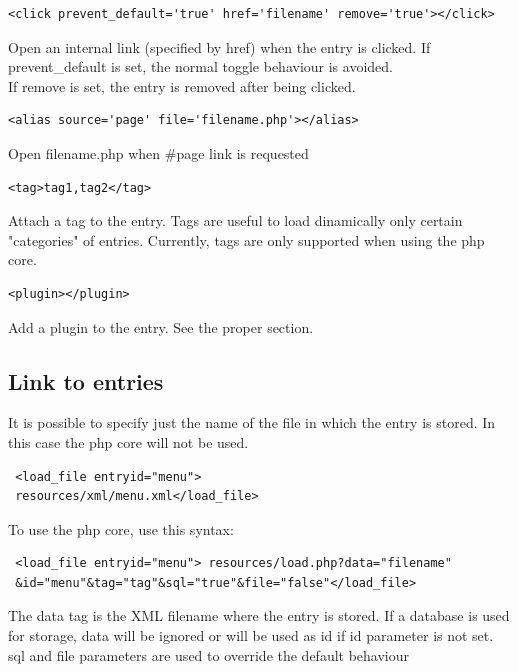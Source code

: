\documentclass[a4paper,12pt]{article}
\begin{document}
\begin{list}{-}{}
\item \begin{verbatim}
<click prevent_default='true' href='filename' remove='true'></click>
\end{verbatim}
Open an internal link (specified by href) when the entry is clicked. If prevent\_default is set, the normal toggle behaviour is avoided.\\
If remove is set, the entry is removed after being clicked.
\item \begin{verbatim}
<alias source='page' file='filename.php'></alias>
\end{verbatim}
Open filename.php when \#page link is requested
\item \begin{verbatim}
<tag>tag1,tag2</tag>
\end{verbatim}
Attach a tag to the entry. Tags are useful to load dinamically only certain "categories" of entries. Currently, tags are only supported when using the php core.
\item \begin{verbatim}
<plugin></plugin>
\end{verbatim}
Add a plugin to the entry. See the proper section.
\end{list}
\normalsize
\subsection{Link to entries}
It is possible to specify just the name of the file in which the entry is stored. In this case the php core will not be used. 
\begin{verbatim}
 <load_file entryid="menu">
 resources/xml/menu.xml</load_file>
\end{verbatim}
To use the php core, use this syntax:
\begin{verbatim}
 <load_file entryid="menu"> resources/load.php?data="filename"
 &id="menu"&tag="tag"&sql="true"&file="false"</load_file>
\end{verbatim}
The data tag is the XML filename where the entry is stored. If a database is used for storage, data will be ignored or will be used as id if id parameter is not set.\\
sql and file parameters are used to override the default behaviour
\end{document}
